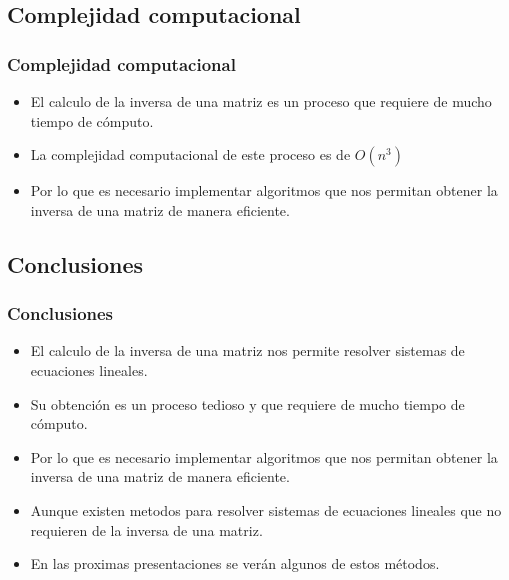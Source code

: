 \documentclass{beamer}
\begin{document}
    \subsection{Complejidad computacional}

    \begin{frame}
        \frametitle{Complejidad computacional}
        \begin{itemize}
            \item El calculo de la inversa de una matriz es un proceso que requiere de mucho tiempo de cómputo.\\
            \item La complejidad computacional de este proceso es de $O(n^3)$\\
            \item Por lo que es necesario implementar algoritmos que nos permitan obtener la inversa de una matriz de manera eficiente.\\
        \end{itemize}
    \end{frame}

    \subsection{Conclusiones}
    \begin{frame}
        \frametitle{Conclusiones}
        \begin{itemize}
            \item El calculo de la inversa de una matriz nos permite resolver sistemas de ecuaciones lineales.\\
            \item Su obtención es un proceso tedioso y que requiere de mucho tiempo de cómputo.\\
            \item Por lo que es necesario implementar algoritmos que nos permitan obtener la inversa de una matriz de manera eficiente.\\
            \item Aunque existen metodos para resolver sistemas de ecuaciones lineales que no requieren de la inversa de una matriz.\\
            \item En las proximas presentaciones se verán algunos de estos métodos.
        \end{itemize}
    \end{frame}
\end{document}
